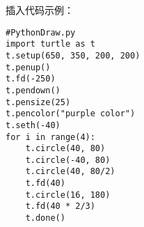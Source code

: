 插入代码示例：

\begin{lstlisting}[style=python,title={Python code}] 
#PythonDraw.py
import turtle as t
t.setup(650, 350, 200, 200)
t.penup()
t.fd(-250)
t.pendown()
t.pensize(25)
t.pencolor("purple color")
t.seth(-40)
for i in range(4):
    t.circle(40, 80)
    t.circle(-40, 80)
    t.circle(40, 80/2)
    t.fd(40)
    t.circle(16, 180)
    t.fd(40 * 2/3)
    t.done()
\end{lstlisting}
